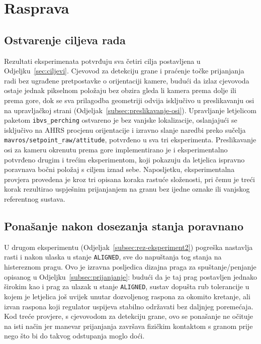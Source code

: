 \section{Rasprava}
\label{sec:rasprava}

\subsection{Ostvarenje ciljeva rada}
\label{subsec:rasprava-ciljevi}

Rezultati eksperimenata potvrđuju sva četiri cilja postavljena u Odjeljku~\ref{sec:ciljevi}. Cjevovod za detekciju grane i praćenje točke prijanjanja radi bez ugrađene pretpostavke o orijentaciji kamere, budući da izlaz cjevovoda ostaje jednak pikselnom položaju bez obzira gleda li kamera prema dolje ili prema gore, dok se sva prilagodba geometriji odvija isključivo u preslikavanju osi na upravljačkoj strani (Odjeljak~\ref{subsec:preslikavanje-osi}). Upravljanje letjelicom paketom \texttt{ibvs\_perching} ostvareno je bez vanjske lokalizacije, oslanjajući se isključivo na AHRS procjenu orijentacije i izravno slanje naredbi preko sučelja \texttt{mavros/setpoint\_raw/attitude}, potvrđeno u sva tri eksperimenta. Preslikavanje osi za kameru okrenutu prema gore implementirano je i eksperimentalno potvrđeno drugim i trećim eksperimentom, koji pokazuju da letjelica ispravno poravnava bočni položaj s ciljem iznad sebe. Naposljetku, eksperimentalna provjera provedena je kroz tri opisana koraka rastuće složenosti, pri čemu je treći korak rezultirao uspješnim prijanjanjem na granu bez ijedne oznake ili vanjskog referentnog sustava.

\subsection{Ponašanje nakon dosezanja stanja poravnano}
\label{subsec:rasprava-uzdignuti-cilj}

U drugom eksperimentu (Odjeljak~\ref{subsec:rez-eksperiment2}) pogreška nastavlja rasti i nakon ulaska u stanje \texttt{ALIGNED}, sve do napuštanja tog stanja na histereznom pragu. Ovo je izravna posljedica dizajna praga za spuštanje/penjanje opisanog u Odjeljku~\ref{subsec:prijanjanje}: budući da je taj prag postavljen jednako širokim kao i prag za ulazak u stanje \texttt{ALIGNED}, sustav dopušta rub tolerancije u kojem je letjelica još uvijek unutar dozvoljenog raspona za okomito kretanje, ali izvan raspona koji regulator uspijeva stabilno održavati bez daljnjeg poremećaja. Kod treće provjere, s cjevovodom za detekciju grane, ovo se ponašanje ne očituje na isti način jer manevar prijanjanja završava fizičkim kontaktom s granom prije nego što bi do takvog odstupanja moglo doći.

